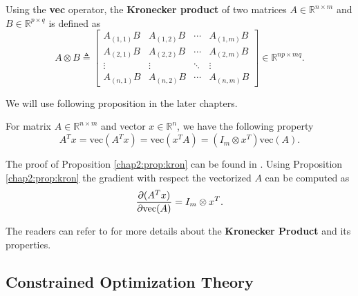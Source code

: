\begin{definition}
  Using the \textbf{vec} operator, the \textbf{Kronecker product} of two matrices $A\in\mathbb R^{n\times m}$ and $B\in\mathbb R^{p\times q}$ is defined as
  \begin{equation}
      A\otimes B\triangleq 
      \begin{bmatrix}
        A_{(1,1)}B & A_{(1,2)}B & \cdots & A_{(1,m)}B \\
        A_{(2,1)}B & A_{(2,2)}B & \cdots & A_{(2,m)}B \\
        \vdots & \vdots & \ddots & \vdots \\
        A_{(n,1)}B & A_{(n,2)}B & \cdots & A_{(n,m)}B
      \end{bmatrix}
      \in\mathbb R^{np\times mq}
      .
  \end{equation}
\end{definition}

We will use following proposition in the later chapters.
\begin{proposition}
  For matrix $A\in\mathbb R^{n\times m}$ and vector $x\in\mathbb R^n$, we have the following property
  \begin{equation}
    A^Tx = \text{vec}(A^Tx) = \text{vec}(x^TA) = (I_m\otimes x^T)\text{vec}(A)
    .
  \end{equation}
  \label{chap2:prop:kron}
\end{proposition}
The proof of Proposition \ref{chap2:prop:kron} can be found in \cite{RN22}.
Using Proposition \ref{chap2:prop:kron} the gradient with respect the vectorized $A$ can be computed as
\begin{equation}
  {\partial (A^Tx)\over\partial \text{vec}(A)} = I_m\otimes x^T
  .
\end{equation}

The readers can refer to \cite[Chapter 7]{RN22} for more details about the \textbf{Kronecker Product} and its properties.

\subsection{Constrained Optimization Theory} 

